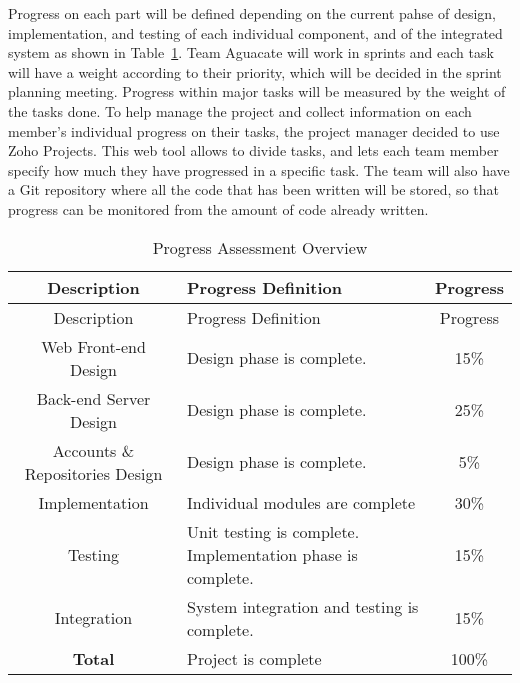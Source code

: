 
Progress on each part will be defined depending on the current pahse of design, implementation, and testing of each individual component, and of the integrated system as shown in Table~\ref{asses}. Team Aguacate will work in sprints and each task
will have a weight according to their priority, which will be decided in the
sprint planning meeting. Progress within major tasks will be measured by the weight of
the tasks done. To help manage the project and collect information on each member's individual
progress on their tasks, the project manager decided to use Zoho Projects. This
web tool allows to divide tasks, and lets each team member specify how much they have
progressed in a specific task. The team will also have a Git repository where
all the code that has been written will be stored, so that progress can be
monitored from the amount of code already written.

\begin{center}
\setlength{\extrarowheight}{1.5pt}
  \begin{longtable}{|c|m{7.5cm}|c|}
 \caption{Progress Assessment Overview \label{asses}} \\
   \hline
  
  \centering Description & Progress Definition & Progress \\
  \hline \hline \endfirsthead
  
     \hline

	\centering Description & Progress Definition & Progress \\
  \hline \hline \endhead
  
  \endfoot  
  
  Web Front-end Design & Design phase is complete. & 15\%\\ \hline   
  Back-end Server Design & Design phase is complete. & 25\%\\ \hline   
  Accounts \& Repositories Design & Design phase is complete. & 5\%\\ \hline 
  Implementation & Individual modules are complete & 30\%\\ \hline 
  Testing & Unit testing is complete. Implementation phase is complete. & 15\%\\ \hline
  Integration & System integration and testing is complete. & 15\%\\ \hline
  \textbf{Total} & Project is complete & 100\% \\ \hline   
  \end{longtable} \end{center}